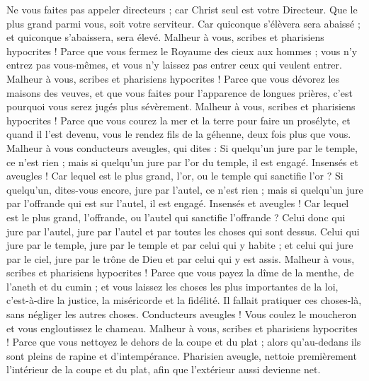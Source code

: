 \begin{multicols}{2}
Ne vous faites pas appeler directeurs ; car Christ seul est votre Directeur.
Que le plus grand parmi vous, soit votre serviteur.
Car quiconque s'élèvera sera abaissé ; et quiconque s'abaissera, sera élevé.
Malheur à vous, scribes et pharisiens hypocrites ! Parce que vous fermez le Royaume des cieux aux hommes ; vous n'y entrez pas vous-mêmes, et vous n’y laissez pas entrer ceux qui veulent entrer.
Malheur à vous, scribes et pharisiens hypocrites ! Parce que vous dévorez les maisons des veuves, et que vous faites pour l’apparence de longues prières, c'est pourquoi vous serez jugés plus sévèrement.
Malheur à vous, scribes et pharisiens hypocrites ! Parce que vous courez la mer et la terre pour faire un prosélyte, et quand il l'est devenu, vous le rendez fils de la géhenne, deux fois plus que vous.
Malheur à vous conducteurs aveugles, qui dites : Si quelqu’un jure par le temple, ce n'est rien ; mais si quelqu’un jure par l'or du temple, il est engagé.
Insensés et aveugles ! Car lequel est le plus grand, l'or, ou le temple qui sanctifie l'or ?
Si quelqu’un, dites-vous encore, jure par l'autel, ce n'est rien ; mais si quelqu’un jure par l’offrande qui est sur l'autel, il est engagé.
Insensés et aveugles ! Car lequel est le plus grand, l’offrande, ou l'autel qui sanctifie l’offrande ?
Celui donc qui jure par l'autel, jure par l'autel et par toutes les choses qui sont dessus.
Celui qui jure par le temple, jure par le temple et par celui qui y habite ;
et celui qui jure par le ciel, jure par le trône de Dieu et par celui qui y est assis.
Malheur à vous, scribes et pharisiens hypocrites ! Parce que vous payez la dîme{} de la menthe, de l'aneth et du cumin ; et vous laissez les choses les plus importantes de la loi, c'est-à-dire la justice, la miséricorde et la fidélité. Il fallait pratiquer ces choses-là, sans négliger les autres choses.
Conducteurs aveugles ! Vous coulez le moucheron et vous engloutissez le chameau{}.
Malheur à vous, scribes et pharisiens hypocrites ! Parce que vous nettoyez le dehors de la coupe et du plat ; alors qu’au-dedans ils sont pleins de rapine et d'intempérance.
Pharisien aveugle, nettoie premièrement l’intérieur de la coupe et du plat, afin que l’extérieur aussi devienne net.

\end{multicols}
